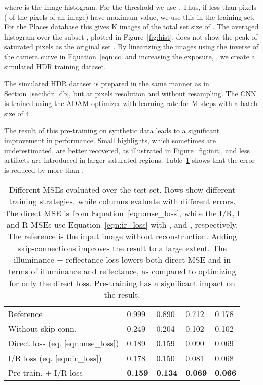 \documentclass[acmtog]{acmart}
\newcommand{\figref}[1]{Figure~\ref{fig:#1}}
\newcommand{\tabref}[1]{Table~\ref{tab:#1}}
\newcommand{\eqnref}[1]{Equation~\ref{eqn:#1}}
\newcommand{\secref}[1]{Section~\ref{sec:#1}}
\begin{document}
where  is the image histogram. For the threshold we use . Thus, if less than  pixels ( of the  pixels of an image) have maximum value, we use this in the training set. For the Places database this gives K images of the total set size of . The averaged histogram over the subset , plotted in \figref{hist}, does not show the peak of saturated pixels as the original set . By linearizing the images  using the inverse of the camera curve  in \eqnref{cc} and increasing the exposure, , we create a simulated HDR training dataset.

The simulated HDR dataset is prepared in the same manner as in \secref{hdr_db}, but at  pixels resolution and without resampling.
The CNN is trained using the ADAM optimizer with learning rate  for M steps with a batch size of 4.

The result of this pre-training on synthetic data leads to a significant improvement in performance. Small highlights, which sometimes are underestimated, are better recovered, as illustrated in \figref{init}, and less artifacts are introduced in larger saturated regions. \tabref{error} shows that the error is reduced by more than .
 

\begin{table}[b]
	\newcommand\crot{0}
\def\arraystretch{1.4}
	\setlength\tabcolsep{0.3cm}
	\centering
	\caption{Different MSEs evaluated over the test set. Rows show different training strategies, while columns evaluate with different errors. The direct MSE is from \eqnref{mse_loss}, while the I/R, I and R MSEs use \eqnref{ir_loss} with ,  and , respectively. The reference is the input image without reconstruction. Adding skip-connections improves the result to a large extent. The illuminance + reflectance loss lowers both direct MSE and in terms of illuminance and reflectance, as compared to optimizing for only the direct loss. Pre-training has a significant impact on the result.}
	\begin{tabular}{l|llll}
		&\hspace{0cm}\rotatebox[origin=l]{\crot}{Direct} &
		\hspace{0cm}\rotatebox[origin=l]{\crot}{I/R} &
		\hspace{0cm}\rotatebox[origin=l]{\crot}{I} &
		\hspace{0cm}\rotatebox[origin=l]{\crot}{R}\\
		\hline
		\rowcolor{rc}
		Reference   & 0.999  &  0.890  &  0.712  &  0.178 \\
		Without skip-conn.   & 0.249  &  0.204  &  0.102 &  0.102  \\
		\rowcolor{rc}
		Direct loss (eq. \ref{eqn:mse_loss})    & 0.189  &  0.159  &  0.090  &  0.069  \\
		I/R loss (eq. \ref{eqn:ir_loss}) & 0.178  &  0.150  &  0.081  &  0.068 \\
		\rowcolor{rc}
		Pre-train. + I/R loss & \bf{0.159}  &  \bf{0.134}  &  \bf{0.069} &   \bf{0.066} \\
		
	\end{tabular}
	\label{tab:error}
\end{table}
\end{document}
